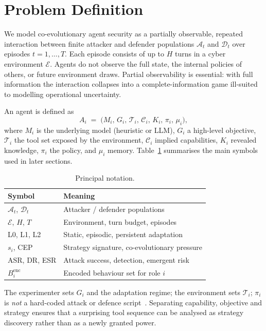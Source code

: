 \section{Problem Definition}
\label{sec:problem}

We model co-evolutionary agent security as a partially observable,
repeated interaction between finite attacker and defender populations
$\mathcal{A}_t$ and $\mathcal{D}_t$ over episodes $t=1,\ldots,T$. Each
episode consists of up to $H$ turns in a cyber environment $\mathcal{E}$.
Agents do not observe the full state, the internal policies of others, or
future environment draws. Partial observability is essential: with full
information the interaction collapses into a complete-information game
ill-suited to modelling operational uncertainty.

An agent is defined as
\begin{equation}
  A_i \;=\; \bigl(M_i,\, G_i,\, \mathcal{T}_i,\, \mathcal{C}_i,\,
  K_i,\, \pi_i,\, \mu_i\bigr),
  \label{eq:agent}
\end{equation}
where $M_i$ is the underlying model (heuristic or LLM), $G_i$ a
high-level objective, $\mathcal{T}_i$ the tool set exposed by the
environment, $\mathcal{C}_i$ implied capabilities, $K_i$ revealed
knowledge, $\pi_i$ the policy, and $\mu_i$ memory. Table~\ref{tab:notation}
summarises the main symbols used in later sections.

\begin{table}[!t]
\caption{Principal notation.}
\label{tab:notation}
\centering
\setlength{\tabcolsep}{3pt}
\small
\begin{tabular}{@{}ll@{}}
\toprule
\textbf{Symbol} & \textbf{Meaning} \\
\midrule
$\mathcal{A}_t$, $\mathcal{D}_t$ & Attacker / defender populations \\
$\mathcal{E}$, $H$, $T$ & Environment, turn budget, episodes \\
L0, L1, L2 & Static, episodic, persistent adaptation \\
$s_i$, CEP & Strategy signature, co-evolutionary pressure \\
ASR, DR, ESR & Attack success, detection, emergent risk \\
$B_i^{\mathrm{enc}}$ & Encoded behaviour set for role $i$ \\
\bottomrule
\end{tabular}
\end{table}

The experimenter
sets $G_i$ and the adaptation regime; the environment sets
$\mathcal{T}_i$; $\pi_i$ is \emph{not} a hard-coded attack or defence
script~\cite{yao2023react}. Separating capability, objective and
strategy ensures that a surprising tool sequence can be analysed as
strategy discovery rather than as a newly granted power.

